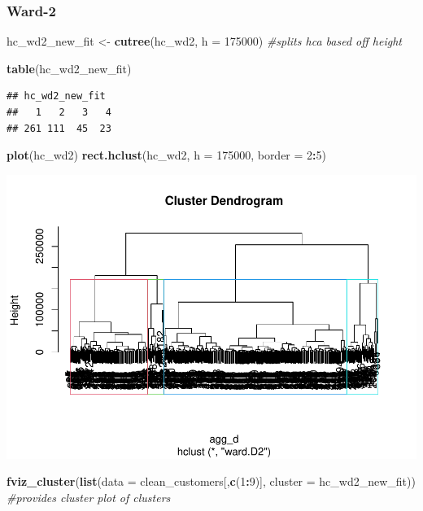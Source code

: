 \documentclass[
  english,
  man]{apa6}
\newenvironment{Shaded}{\begin{snugshade}}{\end{snugshade}}
\newcommand{\CommentTok}[1]{\textcolor[rgb]{0.56,0.35,0.01}{\textit{#1}}}
\newcommand{\DataTypeTok}[1]{\textcolor[rgb]{0.13,0.29,0.53}{#1}}
\newcommand{\DecValTok}[1]{\textcolor[rgb]{0.00,0.00,0.81}{#1}}
\newcommand{\KeywordTok}[1]{\textcolor[rgb]{0.13,0.29,0.53}{\textbf{#1}}}
\newcommand{\NormalTok}[1]{#1}
\newcommand{\OperatorTok}[1]{\textcolor[rgb]{0.81,0.36,0.00}{\textbf{#1}}}
\newcommand{\StringTok}[1]{\textcolor[rgb]{0.31,0.60,0.02}{#1}}
\begin{document}
\hypertarget{ward-2}{%
\subsubsection{Ward-2}\label{ward-2}}

\begin{Shaded}
\begin{Highlighting}[]
\NormalTok{hc_wd2_new_fit <-}\StringTok{ }\KeywordTok{cutree}\NormalTok{(hc_wd2, }\DataTypeTok{h =} \DecValTok{175000}\NormalTok{) }\CommentTok{#splits hca based off height}

\KeywordTok{table}\NormalTok{(hc_wd2_new_fit)}
\end{Highlighting}
\end{Shaded}

\begin{verbatim}
## hc_wd2_new_fit
##   1   2   3   4 
## 261 111  45  23
\end{verbatim}

\begin{Shaded}
\begin{Highlighting}[]
\KeywordTok{plot}\NormalTok{(hc_wd2)}
\KeywordTok{rect.hclust}\NormalTok{(hc_wd2, }\DataTypeTok{h =} \DecValTok{175000}\NormalTok{, }\DataTypeTok{border =} \DecValTok{2}\OperatorTok{:}\DecValTok{5}\NormalTok{)}
\end{Highlighting}
\end{Shaded}

\includegraphics{MSDS680-Week-6-Kmeans-and-HCA_files/figure-latex/ward2 new height-1.pdf}

\begin{Shaded}
\begin{Highlighting}[]
\KeywordTok{fviz_cluster}\NormalTok{(}\KeywordTok{list}\NormalTok{(}\DataTypeTok{data =}\NormalTok{ clean_customers[,}\KeywordTok{c}\NormalTok{(}\DecValTok{1}\OperatorTok{:}\DecValTok{9}\NormalTok{)], }
                  \DataTypeTok{cluster =}\NormalTok{ hc_wd2_new_fit)) }\CommentTok{#provides cluster plot of clusters}
\end{Highlighting}
\end{Shaded}
\end{document}
